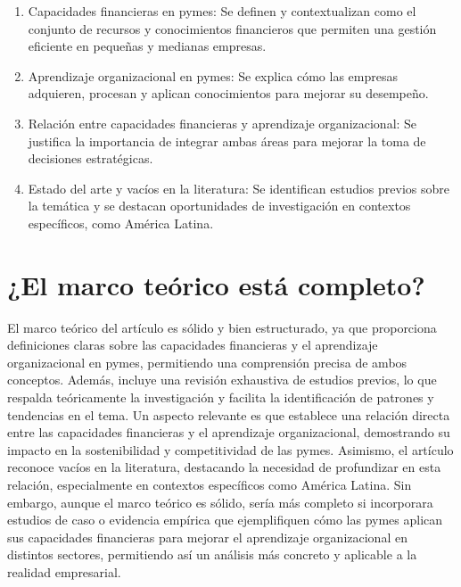 \documentclass[letterpaper, 11pt]{report}
\begin{document}
\begin{enumerate}
      \item Capacidades financieras en pymes: Se definen y contextualizan como el conjunto
            de recursos y conocimientos financieros que permiten una gestión eficiente en
            pequeñas y medianas empresas.

      \item Aprendizaje organizacional en pymes: Se explica cómo las empresas adquieren,
            procesan y aplican conocimientos para mejorar su desempeño.

      \item Relación entre capacidades financieras y aprendizaje organizacional: Se
            justifica la importancia de integrar ambas áreas para mejorar la toma de
            decisiones estratégicas.

      \item Estado del arte y vacíos en la literatura: Se identifican estudios previos
            sobre la temática y se destacan oportunidades de investigación en contextos
            específicos, como América Latina.

\end{enumerate}

\section*{¿El marco teórico está completo?}

El marco teórico del artículo es sólido y bien estructurado, ya que proporciona
definiciones claras sobre las capacidades financieras y el aprendizaje
organizacional en pymes, permitiendo una comprensión precisa de ambos
conceptos. Además, incluye una revisión exhaustiva de estudios previos, lo que
respalda teóricamente la investigación y facilita la identificación de patrones
y tendencias en el tema. Un aspecto relevante es que establece una relación
directa entre las capacidades financieras y el aprendizaje organizacional,
demostrando su impacto en la sostenibilidad y competitividad de las pymes.
Asimismo, el artículo reconoce vacíos en la literatura, destacando la necesidad
de profundizar en esta relación, especialmente en contextos específicos como
América Latina. Sin embargo, aunque el marco teórico es sólido, sería más
completo si incorporara estudios de caso o evidencia empírica que ejemplifiquen
cómo las pymes aplican sus capacidades financieras para mejorar el aprendizaje
organizacional en distintos sectores, permitiendo así un análisis más concreto
y aplicable a la realidad empresarial.
\end{document}
